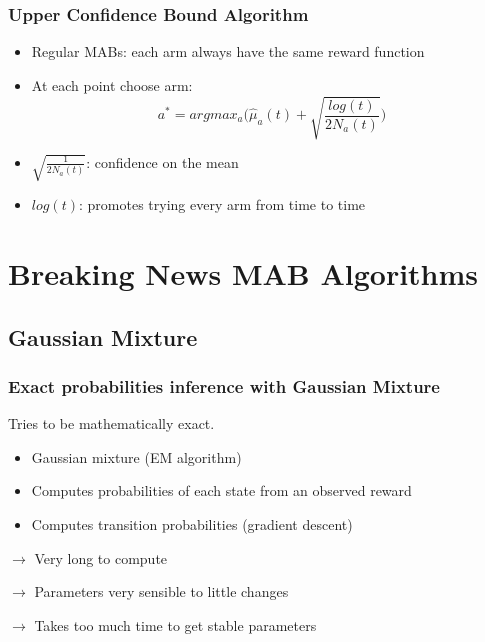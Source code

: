 \documentclass[french]{beamer}
\begin{document}
\begin{frame}
	\frametitle{Upper Confidence Bound Algorithm}

	\begin{itemize}
		\item Regular MABs: each arm always have the same reward function
		\item At each point choose arm:
		\begin{equation*}
		a^* = argmax_{a} \Big(\hat\mu_a(t) + \sqrt{\frac{log(t)}{2N_a(t)}}\Big)
		\end{equation*}
		\item $\sqrt{\frac{1}{2N_a(t)}}$: confidence on the mean
		\item $log(t)$: promotes trying every arm from time to time
	\end{itemize}


\end{frame}

\section{Breaking News MAB Algorithms}
\subsection{Gaussian Mixture}
\begin{frame}
	\frametitle{Exact probabilities inference with Gaussian Mixture}

	Tries to be mathematically exact.
	\begin{itemize}
		\item Gaussian mixture (EM algorithm)
		\item Computes probabilities of each state from an observed reward
		\item Computes transition probabilities (gradient descent)
	\newline
	\end{itemize}

	$\rightarrow$ Very long to compute

	$\rightarrow$ Parameters very sensible to little changes

	$\rightarrow$ Takes too much time to get stable parameters

\end{frame}
\end{document}
